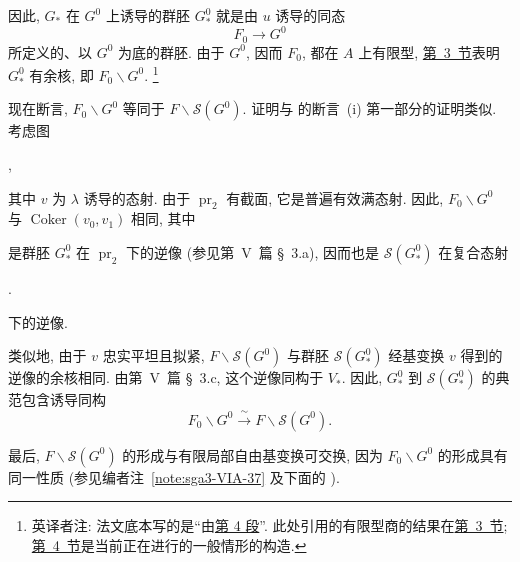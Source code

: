 因此, \(G_*\) 在 \(G^0\) 上诱导的群胚 \(G^0_*\)
就是由 \(u\) 诱导的同态
\[
  F_0\longrightarrow G^0
\]
所定义的、以 \(G^0\) 为底的群胚.
由于 \(G^0\), 因而 \(F_0\), 都在 \(A\) 上有限型,
\hyperref[sec:sga3-VIA-3]{第~3~节}表明 \(G^0_*\) 有余核,
即 \(F_0\backslash G^0\).%
\begingroup
\renewcommand{\thefootnote}{\fnsymbol{footnote}}%
\footnote[2]{英译者注: 法文底本写的是“由\hyperref[sec:sga3-VIA-4]{第 4 段}”.
此处引用的有限型商的结果在\hyperref[sec:sga3-VIA-3]{第~3~节};
\hyperref[sec:sga3-VIA-4]{第~4~节}是当前正在进行的一般情形的构造.}%
\endgroup

现在断言, \(F_0\backslash G^0\) 等同于 \(F\backslash\mathscr S(G^0)\).
证明与 的断言~(i)
第一部分的证明类似. 考虑图
\begin{center}
  \label{diag:sga3-VIA-4.3-span}%
  ,
\end{center}
其中 \(v\) 为 \(\lambda\) 诱导的态射.
由于 \(\operatorname{pr}_2\) 有截面, 它是普遍有效满态射.
因此, \(F_0\backslash G^0\) 与 \(\operatorname{Coker}(v_0,v_1)\) 相同, 其中
\begin{center}
  \label{diag:sga3-VIA-4.3-V-groupoid}%
\end{center}
是群胚 \(G^0_*\) 在 \(\operatorname{pr}_2\) 下的逆像
(参见第~V~篇 \S~3.a), 因而也是 \(\mathscr S(G^0_*)\) 在复合态射
\begin{center}
  \label{diag:sga3-VIA-4.3-composite}%
  .
\end{center}
下的逆像.

类似地, 由于 \(v\) 忠实平坦且拟紧,
\(F\backslash\mathscr S(G^0)\) 与群胚 \(\mathscr S(G^0_*)\)
经基变换 \(v\) 得到的逆像的余核相同.
由第~V~篇 \S~3.c, 这个逆像同构于 \(V_*\).
因此, \(G^0_*\) 到 \(\mathscr S(G^0_*)\) 的典范包含诱导同构
\[
  F_0\backslash G^0
    \xrightarrow{\ \sim\ }
  F\backslash\mathscr S(G^0).
\]

最后, \(F\backslash\mathscr S(G^0)\) 的形成与有限局部自由基变换可交换,
因为 \(F_0\backslash G^0\) 的形成具有同一性质
(参见编者注~\ref{note:sga3-VIA-37} 及下面的 ).
